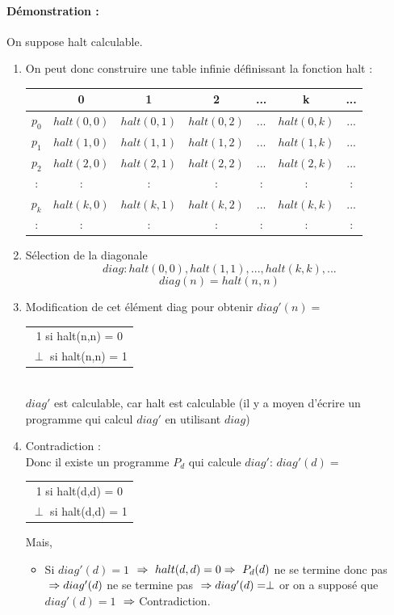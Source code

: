 \paragraph{Démonstration :}
On suppose halt calculable.
\begin{enumerate}
	\item On peut donc construire une table infinie définissant la fonction
		halt : \\
		\begin{tabular}{|c||c|c|c|c|c|c|}
			\hline
			& 0 & 1 & 2 & ... & k & ... \\
			\hline
			$p_0$ & $halt(0,0)$ & $halt(0,1)$ & $halt(0,2)$ & ... & $halt(0,k)$ & ... \\
			$p_1$ & $halt(1,0)$ & $halt(1,1)$ & $halt(1,2)$ & ... & $halt(1,k)$ & ... \\
			$p_2$ & $halt(2,0)$ & $halt(2,1)$ & $halt(2,2)$ & ... & $halt(2,k)$ & ... \\
			: & : &:& : & : & : &:\\
			$p_k$ & $halt(k,0)$ & $halt(k,1)$ & $halt(k,2)$ & ... & $halt(k,k)$ & ... \\
			: & : &:& : & : & : &:\\
			\hline
		\end{tabular}
	\item Sélection de la diagonale
		\[ diag :halt(0,0),halt(1,1),...,halt(k,k),... \]
		\[diag(n) = halt(n,n)\]
	\item Modification de cet élément diag pour obtenir
		$diag'(n) =$
		\begin{tabular}{c}
			1 si halt(n,n) = 0\\
			$\perp$ si halt(n,n) = 1\\
		\end{tabular}\\
		$diag'$ est calculable, car halt est calculable (il y a moyen
		d'écrire un programme qui calcul $diag'$ en utilisant $diag$)
	\item Contradiction :\\
	       	Donc il existe un programme $P_d$ qui calcule
		$diag'$:
		$diag'(d) =$
		\begin{tabular}{c}
			1 si halt(d,d) = 0\\
			$\perp$ si halt(d,d) = 1\\
		\end{tabular}
		Mais,
		\begin{itemize}
			\item Si $diag'(d)= 1$ $\\
			\Rightarrow \  halt(d,d) = 0 \\
			\Rightarrow \ P_d(d)$ ne se termine donc pas $ \\
			\Rightarrow diag'(d)$ ne se termine pas $ \\
			\Rightarrow diag'(d) = \perp$ or on a supposé que $diag'(d) = 1$ $ \\
			\Rightarrow $
			Contradiction.


\end{itemize}
\end{enumerate}
